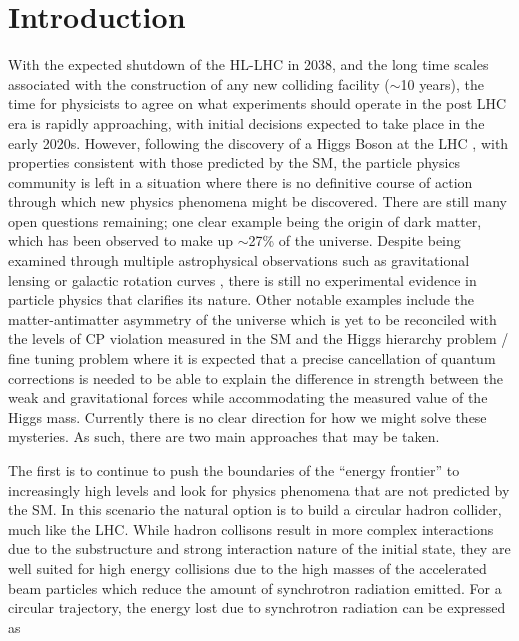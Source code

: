 \chapter{Introduction}

With the expected shutdown of the \ac{HL-LHC} in 2038, and the long time scales associated with the construction of any new colliding facility ($\sim$10 years), the time for physicists to agree on what experiments should operate in the post \ac{LHC} era is rapidly approaching, with initial decisions expected to take place in the early 2020s. However, following the discovery of a Higgs Boson at the \ac{LHC} \cite{:2012gk,Chatrchyan:2012xdj}, with properties consistent with those predicted by the \ac{SM}\cite{Khachatryan:2014jba,Aad:2015gba,Khachatryan:2016vau}, the particle physics community is left in a situation where there is no definitive course of action through which new physics phenomena might be discovered. There are still many open questions remaining; one clear example being the origin of dark matter, which has been observed to make up $\sim$27\% of the universe. Despite being examined through multiple astrophysical observations such as gravitational lensing or galactic rotation curves \cite{Trimble:1987ee}, there is still no experimental evidence in particle physics that clarifies its nature. Other notable examples include the matter-antimatter asymmetry of the universe which is yet to be reconciled with the levels of CP violation measured in the \ac{SM}\cite{Patrignani:2016xqp} and the Higgs hierarchy problem / fine tuning problem\cite{Baer:2012cf} where it is expected that a precise cancellation of quantum corrections is needed to be able to explain the difference in strength between the weak and gravitational forces while accommodating the measured value of the Higgs mass. Currently there is no clear direction for how we might solve these mysteries. As such, there are two main approaches that may be taken.

The first is to continue to push the boundaries of the ``energy frontier'' to increasingly high levels and look for physics phenomena that are not predicted by the \ac{SM}. In this scenario the natural option is to build a circular hadron collider, much like the \ac{LHC}. While hadron collisons result in more complex interactions due to the substructure and strong interaction nature of the initial state, they are well suited for high energy collisions due to the high masses of the accelerated beam particles which reduce the amount of synchrotron radiation emitted. For a circular trajectory, the energy lost due to synchrotron radiation can be expressed as

